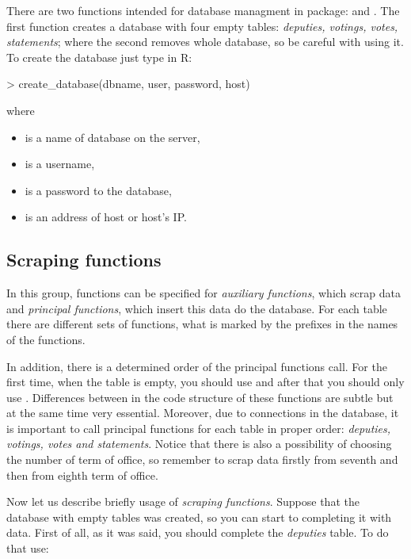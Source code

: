 There are two functions intended for database managment in  package:  and . The first function creates a database with four empty tables: \emph{deputies, votings, votes, statements}; where the second removes whole database, so be careful with using it. To create the database just type in R:

\begin{example}
> create_database(dbname, user, password, host)
\end{example}

where

\begin{itemize}
\item {} is a name of database on the server,
\item {} is a username,
\item {} is a password to the database,
\item {} is an address of host or host's IP.
\end{itemize}

\subsection{Scraping functions}

In this group, functions can be specified for \emph{auxiliary functions}, which scrap data and \emph{principal functions}, which insert this data do the database. For each table there are different sets of functions, what is marked by the prefixes in the names of the functions. 

In addition, there is a determined order of the principal functions call. For the first time, when the table is empty, you should use  and after that you should only use . Differences between in the code structure of these functions are subtle but at the same time very essential. Moreover, due to connections in the database, it is important to call principal functions for each table in proper order: \emph{deputies, votings, votes and statements}. Notice that there is also a possibility of choosing the number of term of office, so remember to scrap data firstly from seventh and then from eighth term of office.

Now let us describe briefly usage of \emph{scraping functions}. Suppose that the database with empty tables was created, so you can start to completing it with data. First of all, as it was said, you should complete the \emph{deputies} table. To do that use:

